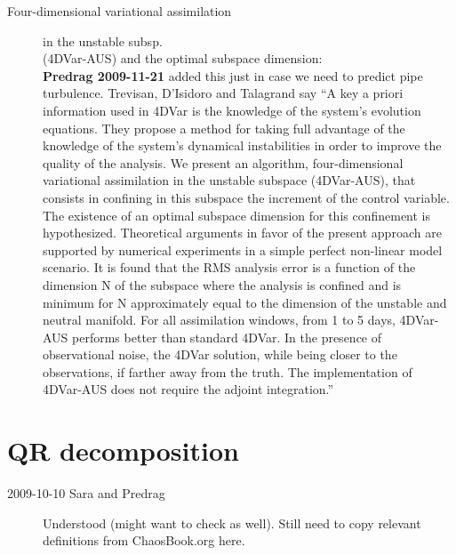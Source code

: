 \begin{description}
\item[Four-dimensional variational assimilation]
	{in the unstable subsp. \\
      (4DVar-AUS) and the optimal subspace dimension}:
	\\
{\bf Predrag
2009-11-21} added this just in case we need to predict pipe turbulence.
Trevisan, D'Isidoro and Talagrand say
``A key a priori information used in 4DVar is the knowledge of the
system's evolution equations. They propose a method for taking full
advantage of the knowledge of the system's dynamical instabilities in
order to improve the quality of the analysis. We present an
algorithm, four-dimensional variational assimilation in the unstable
subspace (4DVar-AUS), that consists in confining in this subspace the
increment of the control variable. The existence of an optimal
subspace dimension for this confinement is hypothesized. Theoretical
arguments in favor of the present approach are supported by numerical
experiments in a simple perfect non-linear model scenario. It is
found that the RMS analysis error is a function of the dimension N of
the subspace where the analysis is confined and is minimum for N
approximately equal to the dimension of the unstable and neutral
manifold. For all assimilation windows, from 1 to 5 days, 4DVar-AUS
performs better than standard 4DVar. In the presence of observational
noise, the 4DVar solution, while being closer to the observations, if
farther away from the truth. The implementation of 4DVar-AUS does not
require the adjoint integration.''


\end{description}

\section{QR decomposition}

\begin{description}
\item[2009-10-10 Sara and Predrag] Understood
     (might want to check
     as well). Still need to copy
    relevant definitions from ChaosBook.org here.
\end{description}

